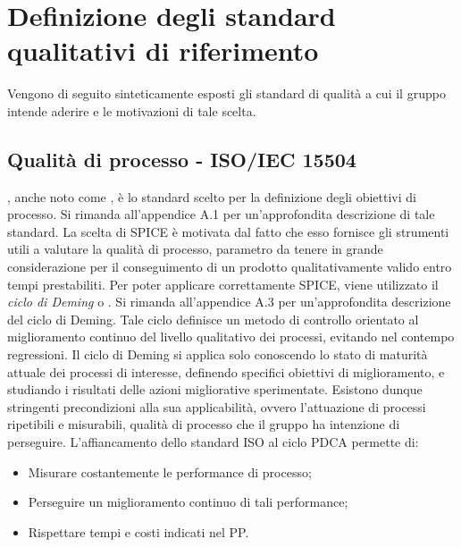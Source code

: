 \documentclass[openany,12pt,a4paper]{report}
\begin{document}
    
    \section{Definizione degli standard \\ qualitativi di riferimento}
    
    Vengono di seguito sinteticamente esposti gli standard di qualità a cui il gruppo intende aderire e le motivazioni di tale scelta.   
    
    \subsection{Qualità di processo - ISO/IEC 15504}
    
    , anche noto come , è lo standard scelto per la definizione degli obiettivi di processo. Si rimanda all'appendice A.1 per un'approfondita descrizione di tale standard.
    La scelta di SPICE è motivata dal fatto che esso fornisce gli strumenti utili a valutare la qualità di processo, parametro da tenere in grande considerazione per il conseguimento di un prodotto qualitativamente valido entro tempi prestabiliti. 
    Per poter applicare correttamente SPICE, viene utilizzato il \textit{ciclo di Deming} o . Si rimanda all'appendice A.3 per un'approfondita descrizione del ciclo di Deming. Tale ciclo definisce un metodo di controllo orientato al miglioramento continuo del livello qualitativo dei processi, evitando nel contempo regressioni. Il ciclo di Deming si applica solo conoscendo lo stato di maturità attuale dei processi di interesse, definendo specifici obiettivi di miglioramento, e studiando i risultati delle azioni migliorative sperimentate. Esistono dunque  stringenti precondizioni alla sua applicabilità, ovvero l'attuazione di processi ripetibili e misurabili, qualità di processo che il gruppo ha intenzione di perseguire. L'affiancamento dello standard ISO al ciclo PDCA permette di:
    
    \begin{itemize}
    	\item Misurare costantemente le performance di processo;
    	\item Perseguire un miglioramento continuo di tali performance;
    	\item Rispettare tempi e costi indicati nel PP.
    \end{itemize} 
    
\end{document}
